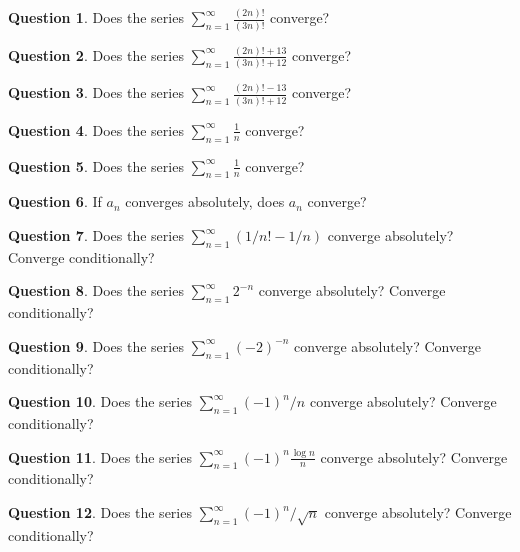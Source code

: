 \documentclass[12pt]{article}
\theoremstyle{definition}
\newtheorem{question}{Question}
\newcommand{\sumn}{\displaystyle\sum_{n=1}^{\infty}}
\begin{document}
\begin{question}
Does the series $\sumn \displaystyle\frac{(2n)!}{(3n)!}$ converge?
\end{question}

\begin{question}
Does the series $\sumn \displaystyle\frac{(2n)! + 13}{(3n)! + 12}$ converge?
\end{question}

\begin{question}
Does the series $\sumn \displaystyle\frac{(2n)! - 13}{(3n)! + 12}$ converge?
\end{question}

\begin{question}
Does the series $\sumn \displaystyle\frac{1}{n}$ converge?
\end{question}

\begin{question}
Does the series $\sumn \displaystyle\frac{1}{n}$ converge?
\end{question}

\begin{question}
If $a_n$ converges absolutely, does $a_n$ converge?
\end{question}

\begin{question}
Does the series $\sumn (1/n! - 1/n)$ converge absolutely?  Converge conditionally?
\end{question}

\begin{question}
Does the series $\sumn 2^{-n}$ converge absolutely?  Converge conditionally?
\end{question}

\begin{question}
Does the series $\sumn (-2)^{-n}$ converge absolutely?  Converge conditionally?
\end{question}

\begin{question}
Does the series $\sumn (-1)^n / n$ converge absolutely?  Converge conditionally?
\end{question}

\begin{question}
Does the series $\sumn (-1)^n \displaystyle\frac{\log n}{n}$ converge absolutely?  Converge conditionally?
\end{question}

\begin{question}
Does the series $\sumn (-1)^n / \sqrt{n}$ converge absolutely?  Converge conditionally?
\end{question}
\end{document}
